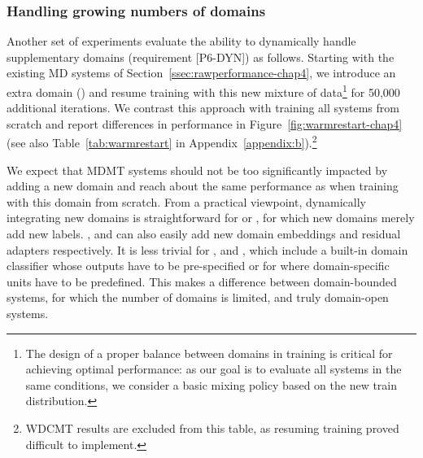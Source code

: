 \subsubsection{Handling growing numbers of domains}
\label{ssec:continual-chap4}
Another set of experiments evaluate the ability to dynamically handle supplementary domains (requirement [P6-DYN]) as follows. Starting with the existing MD systems of Section~\ref{ssec:rawperformance-chap4}, we introduce an extra domain () and resume training with this new mixture of data\footnote{The design of a proper balance between domains in training is critical for achieving optimal performance: as our goal is to evaluate all systems in the same conditions, we consider a basic mixing policy based on the new train distribution.} for 50,000 additional iterations. We contrast this approach with training all systems from scratch and report differences in performance in Figure~\ref{fig:warmrestart-chap4} (see also Table~\ref{tab:warmrestart} in Appendix~\ref{appendix:b}).\footnote{WDCMT results are excluded from this table, as resuming training proved difficult to implement.}

We expect that MDMT systems should not be too significantly impacted by adding a new domain and reach about the same performance as when training with this domain from scratch. From a practical viewpoint, dynamically integrating new domains is straightforward for  or , for which new domains merely add new labels. ,  and  can also easily add new domain embeddings and residual adapters respectively. It is less trivial for ,  and , which include a built-in domain classifier whose outputs have to be pre-specified or for  where domain-specific units have to be predefined. This makes a difference between domain-bounded systems, for which the number of domains is limited, and truly domain-open systems.

\begin{figure*}[h!]
    \begin{center}
        
    \end{center}
    \caption[Ability to handle a new domain]{Ability to handle a new domain. .}
    \label{fig:warmrestart-chap4}
\end{figure*}


